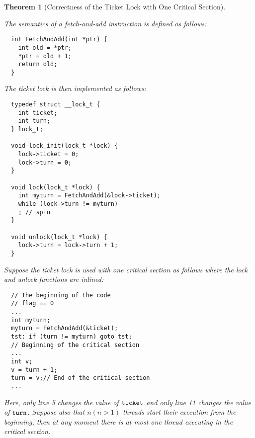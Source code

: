 \documentclass{article}[10pt]
\newtheorem{mythm}[mydef]{Theorem}
\newcommand{\kwd}[1]{\ensuremath{\text{\ttfamily #1}}\xspace}
\def\kturn{\kwd{turn}}
\def\kticket{\kwd{ticket}}
\begin{document}
\begin{mythm}[Correctness of the Ticket Lock with One Critical Section]
\label{thm:ticket-lock-correct}

The semantics of a fetch-and-add instruction is defined as follows:
%
\begin{lstlisting}
  int FetchAndAdd(int *ptr) {
    int old = *ptr;
    *ptr = old + 1;
    return old;
  }  
\end{lstlisting}
%
The ticket lock is then implemented as follows:
%
\begin{lstlisting}
  typedef struct __lock_t {
    int ticket;
    int turn;
  } lock_t;

  void lock_init(lock_t *lock) {
    lock->ticket = 0;
    lock->turn = 0;
  }

  void lock(lock_t *lock) {
    int myturn = FetchAndAdd(&lock->ticket);
    while (lock->turn != myturn)
    ; // spin
  }

  void unlock(lock_t *lock) {
    lock->turn = lock->turn + 1;
  }  
\end{lstlisting}
%
Suppose the ticket lock is used with one critical section as follows
where the lock and unlock functions are inlined:
%
\begin{lstlisting}
  // The beginning of the code
  // flag == 0
  ...
  int myturn;
  myturn = FetchAndAdd(&ticket);
  tst: if (turn != myturn) goto tst;
  // Beginning of the critical section
  ...
  int v;
  v = turn + 1; 
  turn = v;// End of the critical section
  ...
\end{lstlisting}
%
Here, only line 5 changes the value of \kticket and only line 11
changes the value of \kturn.
%
Suppose also that $n (n > 1)$ threads start their execution from the
beginning, then at any moment there is at most one thread executing in
the critical section.
\end{mythm}
%
\end{document}
